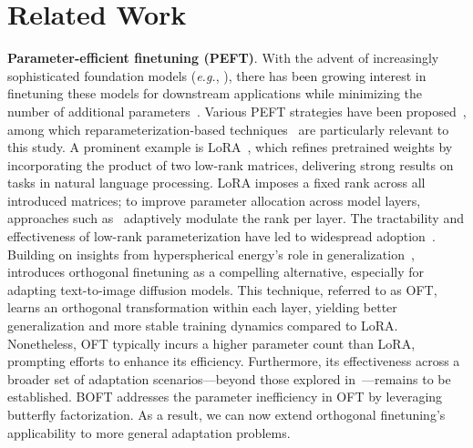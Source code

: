 \section{Related Work}

\textbf{Parameter-efficient finetuning (PEFT)}. With the advent of increasingly sophisticated foundation models (\emph{e.g.}, \cite{brown2020language,radford2021learning,rombach2022high,kirillov2023segment}), there has been growing interest in finetuning these models for downstream applications while minimizing the number of additional parameters~\cite{treviso2023efficient,ding2023parameter,lialin2023scaling}. Various PEFT strategies have been proposed~\cite{houlsby2019parameter,aghajanyan2020intrinsic,hulora2022,edalati2022krona,wang2022adamix,gheini2021cross,zaken2022bitfit,guo2020parameter,sung2021training,ansell2022composable,lester2021power,li2021prefix,vu2022spot,he2021towards,mao2021unipelt,karimi2021compacter,liu2022few,sung2022lst,chen2022parameter,jia2022visual,chen2022adaptformer,zhang2022neural,jie2023fact,lian2022scaling,luo2023towards}, among which reparameterization-based techniques~\cite{aghajanyan2020intrinsic,hulora2022,edalati2022krona} are particularly relevant to this study. A prominent example is LoRA~\cite{hulora2022}, which refines pretrained weights by incorporating the product of two low-rank matrices, delivering strong results on tasks in natural language processing. LoRA imposes a fixed rank across all introduced matrices; to improve parameter allocation across model layers, approaches such as~\cite{zhang2022adaptive,valipour2022dylora,zhang2023increlora} adaptively modulate the rank per layer. The tractability and effectiveness of low-rank parameterization have led to widespread adoption~\cite{dettmers2023qlora,zi2023delta,chavan2023one}. Building on insights from hyperspherical energy's role in generalization~\cite{liu2018learning,liu2021orthogonal}, \cite{qiu2023controlling} introduces orthogonal finetuning as a compelling alternative, especially for adapting text-to-image diffusion models. This technique, referred to as OFT, learns an orthogonal transformation within each layer, yielding better generalization and more stable training dynamics compared to LoRA. Nonetheless, OFT typically incurs a higher parameter count than LoRA, prompting efforts to enhance its efficiency. Furthermore, its effectiveness across a broader set of adaptation scenarios—beyond those explored in~\cite{qiu2023controlling}—remains to be established. BOFT addresses the parameter inefficiency in OFT by leveraging butterfly factorization. As a result, we can now extend orthogonal finetuning's applicability to more general adaptation problems.

